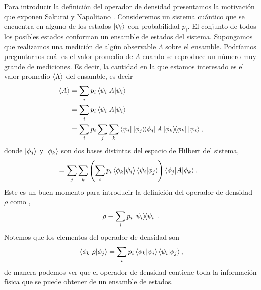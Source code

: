 Para introducir la definición del operador de densidad presentamos la 
motivación que exponen Sakurai y Napolitano \cite{sakurai_napolitano_2017}.
Consideremos un sistema cuántico que se encuentra en alguno de los estados 
$\ket{\psi_{i} }$ con probabilidad $p_i$. El conjunto de todos los posibles estados
conforman un ensamble de estados del sistema. Supongamos que realizamos 
una medición de algún observable $\Lambda$ sobre el ensamble. Podríamos 
preguntarnos cuál es el valor promedio de $\Lambda$ cuando se 
reproduce un número muy grande de mediciones. 
Es decir, la cantidad en la que estamos interesado es el 
valor promedio $\expval{\Lambda}$ del ensamble, es decir
\begin{align}
	\expval{A} &= \sum_i p_i \matrixel{\psii}{A}{\psii} \\
	&= \sum_i p_i \matrixel{\psii}{A}{\psii} \\
	&= \sum_ip_i \sum _j\sum _k
	\bra{\psii}\dyad{\phi_j}{\phi_j}A\dyad{\phi_k}{\phi_k}\Pk{i},
\end{align}
donde $\ket{\phi_j}$ y $\ket{\phi_k}$ son dos bases distintas del
espacio de Hilbert del sistema,
\begin{align}
	&= \sum _j\sum _k \qty(\sum_ip_i \braket{\phi_k}{\psii}
	\braket{\psii}{\phi_j})	\matrixel{\phi_j}{A}{\phi_k}.
\end{align}
Este es un buen momento para introducir la definición 
del operador de densidad $\rho$ como \cite{nielsen_chuang_2011}, \cite{sakurai_napolitano_2017}
\begin{equation}
	\rho \equiv \sum _i p_i\dyad{\psi_i}{\psi_i}.
	\label{eq:rho_def}
\end{equation}
Notemos que los elementos del operador de densidad son
\begin{align}
	\matrixel{\phi_k}{\rho}{\phi_j} = 
	\sum_ip_i \braket{\phi_k}{\psii}\braket{\psii}{\phi_j},
\end{align}
de manera podemos ver que el operador de densidad contiene 
toda la información física que se puede obtener de un ensamble de estados.

